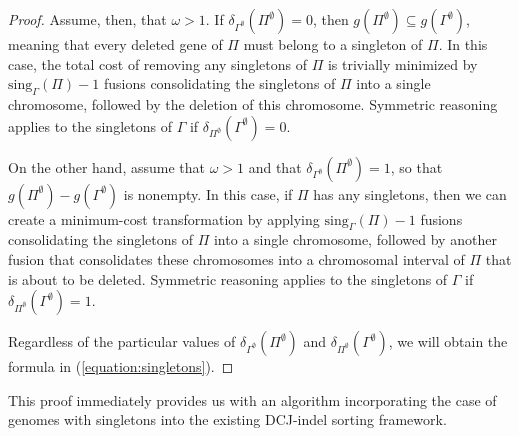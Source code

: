 \begin{proof}
Assume, then, that $\omega > 1$. If $\delta_{\Gamma^{\emptyset}}(\Pi^{\emptyset}) = 0$, then $g(\Pi^{\emptyset}) \subseteq g(\Gamma^{\emptyset})$, meaning that every deleted gene of $\Pi$ must belong to a singleton of $\Pi$. In this case, the total cost of removing any singletons of $\Pi$ is trivially minimized by $\mathrm{sing}_{\Gamma}(\Pi) - 1$ fusions consolidating the singletons of $\Pi$ into a single chromosome, followed by the deletion of this chromosome. Symmetric reasoning applies to the singletons of $\Gamma$ if $\delta_{\Pi^{\emptyset}}(\Gamma^{\emptyset}) = 0$.

On the other hand, assume that $\omega > 1$ and that $\delta_{\Gamma^{\emptyset}}(\Pi^{\emptyset}) = 1$, so that $g(\Pi^{\emptyset}) - g(\Gamma^{\emptyset})$ is nonempty.  In this case, if $\Pi$ has any singletons, then we can create a minimum-cost transformation by applying $\mathrm{sing}_{\Gamma}(\Pi) - 1$ fusions consolidating the singletons of $\Pi$ into a single chromosome, followed by another fusion that consolidates these chromosomes into a chromosomal interval of $\Pi$ that is about to be deleted.  Symmetric reasoning applies to the singletons of $\Gamma$ if $\delta_{\Pi^{\emptyset}}(\Gamma^{\emptyset}) = 1$.

Regardless of the particular values of $\delta_{\Gamma^{\emptyset}}(\Pi^{\emptyset})$ and $\delta_{\Pi^{\emptyset}}(\Gamma^{\emptyset})$, we will obtain the formula in (\ref{equation:singletons}).
\end{proof}

\noindent This proof immediately provides us with an algorithm incorporating the case of genomes with singletons into the existing DCJ-indel sorting framework.

